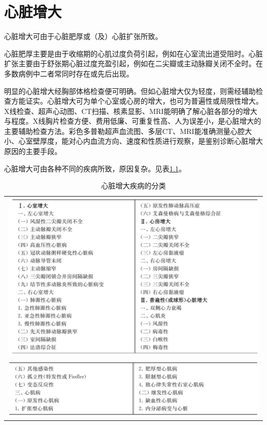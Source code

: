 \chapter{心脏增大}

心脏增大可由于心脏肥厚或（及）心脏扩张所致。

心脏肥厚主要是由于收缩期的心肌过度负荷引起，例如在心室流出道受阻时。心脏扩张主要由于舒张期心脏过度充盈引起，例如在二尖瓣或主动脉瓣关闭不全时。在多数病例中二者常同时存在或先后出现。

明显的心脏增大经胸部体格检查便可明确。但如心脏增大仅为轻度，则需经辅助检查方能证实。心脏增大可为单个心室或心房的增大，也可为普遍性或局限性增大。X线检查、超声心动图、CT扫描、核素显影、MRI能明确了解心脏各部分的增大与程度。X线胸片检查方便、费用低廉、可重复性高、人为误差小，是心脏增大的主要辅助检查方法。彩色多普勒超声血流图、多层CT、MRI能准确测量心腔大小、心室壁厚度，能对心内血流方向、速度和性质进行观察，是鉴别诊断心脏增大原因的主要手段。

心脏增大可由各种不同的疾病所致，原因复杂。见表\ref{tab16-1}。

\begin{longtable}{c}
 \caption{心脏增大疾病的分类}
 \label{tab16-1}
 \endfirsthead
 \caption[]{心脏增大疾病的分类}
 \endhead
 \includegraphics[width=\textwidth,height=\textheight,keepaspectratio]{./images/Image00100.jpg}\\
 \includegraphics[width=\textwidth,height=\textheight,keepaspectratio]{./images/Image00101.jpg}
 \end{longtable}

